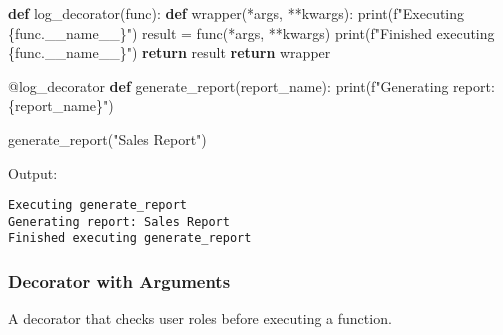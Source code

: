 \documentclass[
  letterpaper,
  DIV=11,
  numbers=noendperiod]{scrreprt}
\newenvironment{Shaded}{\begin{snugshade}}{\end{snugshade}}
\newcommand{\AttributeTok}[1]{\textcolor[rgb]{0.40,0.45,0.13}{#1}}
\newcommand{\BuiltInTok}[1]{\textcolor[rgb]{0.00,0.23,0.31}{#1}}
\newcommand{\ControlFlowTok}[1]{\textcolor[rgb]{0.00,0.23,0.31}{\textbf{#1}}}
\newcommand{\KeywordTok}[1]{\textcolor[rgb]{0.00,0.23,0.31}{\textbf{#1}}}
\newcommand{\NormalTok}[1]{\textcolor[rgb]{0.00,0.23,0.31}{#1}}
\newcommand{\OperatorTok}[1]{\textcolor[rgb]{0.37,0.37,0.37}{#1}}
\newcommand{\SpecialCharTok}[1]{\textcolor[rgb]{0.37,0.37,0.37}{#1}}
\newcommand{\SpecialStringTok}[1]{\textcolor[rgb]{0.13,0.47,0.30}{#1}}
\newcommand{\StringTok}[1]{\textcolor[rgb]{0.13,0.47,0.30}{#1}}
\newcommand{\VariableTok}[1]{\textcolor[rgb]{0.07,0.07,0.07}{#1}}
\begin{document}
\begin{Shaded}
\begin{Highlighting}[]
\KeywordTok{def}\NormalTok{ log\_decorator(func):}
    \KeywordTok{def}\NormalTok{ wrapper(}\OperatorTok{*}\NormalTok{args, }\OperatorTok{**}\NormalTok{kwargs):}
        \BuiltInTok{print}\NormalTok{(}\SpecialStringTok{f"Executing }\SpecialCharTok{\{}\NormalTok{func}\SpecialCharTok{.}\VariableTok{\_\_name\_\_}\SpecialCharTok{\}}\SpecialStringTok{"}\NormalTok{)}
\NormalTok{        result }\OperatorTok{=}\NormalTok{ func(}\OperatorTok{*}\NormalTok{args, }\OperatorTok{**}\NormalTok{kwargs)}
        \BuiltInTok{print}\NormalTok{(}\SpecialStringTok{f"Finished executing }\SpecialCharTok{\{}\NormalTok{func}\SpecialCharTok{.}\VariableTok{\_\_name\_\_}\SpecialCharTok{\}}\SpecialStringTok{"}\NormalTok{)}
        \ControlFlowTok{return}\NormalTok{ result}
    \ControlFlowTok{return}\NormalTok{ wrapper}

\AttributeTok{@log\_decorator}
\KeywordTok{def}\NormalTok{ generate\_report(report\_name):}
    \BuiltInTok{print}\NormalTok{(}\SpecialStringTok{f"Generating report: }\SpecialCharTok{\{}\NormalTok{report\_name}\SpecialCharTok{\}}\SpecialStringTok{"}\NormalTok{)}

\NormalTok{generate\_report(}\StringTok{"Sales Report"}\NormalTok{)}
\end{Highlighting}
\end{Shaded}

Output:

\begin{verbatim}
Executing generate_report
Generating report: Sales Report
Finished executing generate_report
\end{verbatim}

\subsubsection{Decorator with Arguments}\label{decorator-with-arguments}

A decorator that checks user roles before executing a function.
\end{document}
